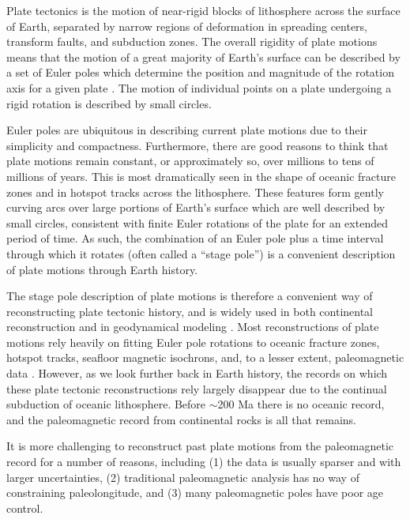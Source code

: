 \documentclass[preprint,12pt,authoryear]{elsarticle}
\begin{document}
Plate tectonics is the motion of near-rigid blocks of lithosphere across the surface of Earth, 
separated by narrow regions of deformation in spreading centers, transform faults, and subduction zones.
The overall rigidity of plate motions means that the motion of a great majority of Earth's surface
can be described by a set of Euler poles which determine the position and magnitude of the rotation axis for a
given plate \citep[cf.][]{cox2009plate}. The motion of individual points on a plate undergoing
a rigid rotation is described by small circles.

Euler poles are ubiquitous in describing current plate motions 
\citep[e.g.][]{demets1990current, argus2011geologically} due to their simplicity and compactness.
Furthermore, there are good reasons to think that plate motions remain constant, or approximately
so, over millions to tens of millions of years. This is most dramatically seen in the shape
of oceanic fracture zones and in hotspot tracks across the lithosphere. These features
form gently curving arcs over large portions of Earth's surface which are well described by small
circles, consistent with finite Euler rotations of the plate for an extended period of time.
As such, the combination of an Euler pole plus a time interval through which it rotates 
(often called a ``stage pole'') is a convenient description of plate motions through Earth history.

The stage pole description of plate motions is therefore a convenient way of reconstructing
plate tectonic history, and is widely used in both continental reconstruction 
\citep[e.g.][]{boyden2011next} and in geodynamical
modeling \citep[e.g.][]{mcnamara2005thermochemical, bull2014effect, rudolph2014history}.
Most reconstructions of plate motions rely heavily on fitting Euler pole rotations
to oceanic fracture zones, hotspot tracks, seafloor magnetic isochrons,
and, to a lesser extent, paleomagnetic data \citep{muller1993revised, seton2012global}.
However, as we look further back in Earth history, the records on which these
plate tectonic reconstructions rely largely disappear due to the continual
subduction of oceanic lithosphere. Before $\sim$200 Ma there is no oceanic record,
and the paleomagnetic record from continental rocks is all that remains.

It is more challenging to reconstruct past plate motions from the paleomagnetic
record for a number of reasons, including 
(1) the data is usually sparser and with larger uncertainties,
(2) traditional paleomagnetic analysis has no way of constraining paleolongitude, and
(3) many paleomagnetic poles have poor age control.
\end{document}
